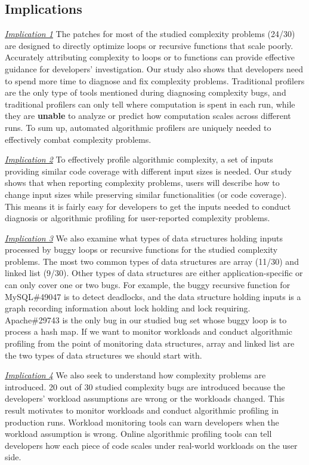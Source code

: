{{\subsection{Implications}
\label{sec:study_impli}

{\underline{\textit{Implication 1}}
The patches for most of the studied complexity problems (24/30)
are designed to directly optimize loops or recursive functions that scale poorly.
Accurately attributing complexity to loops or to functions can provide 
effective guidance for developers' investigation. 
Our study also shows that developers need to spend more time to 
diagnose and fix complexity problems.
Traditional profilers are the only type of tools 
mentioned during diagnosing complexity bugs, 
and traditional profilers can only tell where computation is spent in each run, 
while they are {\bf unable} to analyze or predict how computation scales across different runs.
To sum up, automated algorithmic profilers are 
uniquely needed to effectively combat complexity problems.  


{\underline{\textit{Implication 2}}
To effectively profile algorithmic complexity,
a set of inputs providing similar code coverage with different input sizes is needed. 
Our study shows that when reporting complexity problems,
users will describe how to change input sizes 
while preserving similar functionalities (or code coverage). 
This means it is fairly easy for developers to get the inputs needed 
to conduct diagnosis or algorithmic profiling for user-reported complexity problems. 

{\underline{\textit{Implication 3}}}
We also examine what types of data structures holding inputs processed 
by buggy loops or recursive functions for the studied complexity problems.
The most two common types of data structures 
are array (11/30) and linked list (9/30).
Other types of data structures are either application-specific or 
can only cover one or two bugs.
For example, the buggy recursive function for MySQL\#49047 is to detect deadlocks,
and the data structure holding inputs is a graph recording information about lock holding and lock requiring. 
Apache\#29743 is the only bug in our studied bug set 
whose buggy loop is to process a hash map. 
If we want to monitor workloads and conduct 
algorithmic profiling from the point of monitoring data structures, 
array and linked list are the two types of data structures 
we should start with.

{\underline{\textit{Implication 4}}
We also seek to understand how complexity problems are introduced. 
20 out of 30 studied complexity bugs are introduced
because the developers' workload assumptions are wrong or the workloads changed. 
This result motivates to monitor workloads and conduct algorithmic profiling in production runs. 
Workload monitoring tools can warn developers when the workload assumption is wrong.
Online algorithmic profiling tools can tell developers 
how each piece of code scales under real-world workloads on the user side.  

}}}}}
